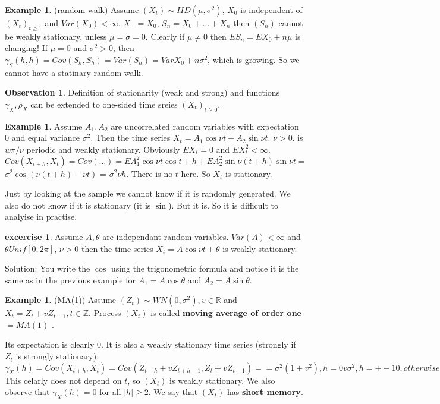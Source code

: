 \documentclass[12pt,a4paper]{amsart}
\theoremstyle{definition} %
\newtheorem{example}[defn]{Example}
\newtheorem{excercise}[defn]{excercise}
\newtheorem{observation}[defn]{Observation}
\theoremstyle{plain} %
\newcommand{\R}{\mathbb R}
\newcommand{\Z}{\mathbb Z}
\begin{document}
\begin{example} (random walk)
Assume $(X_t) \sim IID(\mu, \sigma^2)$, $X_0$ is independent of $(X_t)_{t \geq 1}$ and $Var(X_0) < \infty$.
$X_= = X_0$, $S_n = X_0 + \dots + X_n$ then $(S_n)$ cannot be weakly stationary, unless $\mu = \sigma = 0$.
Clearly if $\mu \neq 0$ then $ES_n = EX_0 + n\mu$ is changing!
If $\mu = 0$ and $\sigma^2 > 0$, then $\gamma_S(h,h) = Cov(S_h, S_h) = Var(S_h) = VarX_0 + n\sigma^2$, which is growing. So we cannot have a statinary random walk.
\end{example}

\begin{observation}
Definition of stationarity (weak and strong) and functions $\gamma_X, \rho_X$ can be extended to one-sided time sreies $(X_t)_ {t\geq 0}$. 
\end{observation}


\begin{example}
Assume $A_1, A_2$ are uncorrelated random variables with expectation $0$ and equal variance $\sigma^2$. Then the time series $X_t = A_1 \cos{\nu t} +A_2 \sin{\nu t}$. $\nu > 0$.
is $w\pi / \nu$ periodic and weakly stationary.
Obviously $EX_t = 0$ and $EX_t^2 < \infty$.
$Cov(X_{t+h}, X_t) = Cov(\dots) = E A_1^2 \cos{\nu t}\cos{t + h} + EA_2^2 \sin{\nu(t + h)}\sin{\nu t} = $
$\sigma^2 \cos(\nu (t + h) - \nu t)$ = $\sigma^2 \nu h$.
There is no $t$ here. So $X_t$ is stationary. 

Just by looking at the sample we cannot know if it is randomly generated. We also do not know if it is stationary (it is $\sin$).
But it is. So it is difficult to analyise in practise.
\end{example}


\begin{excercise}
Assume $A, \theta$ are independant random variables. $Var(A) < \infty$ and $\theta Unif[0,2\pi]$, $\nu > 0$ then the time series
$X_t = A \cos{\nu t + \theta}$ is weakly stationary. 

Solution:
You write the $\cos$ using the trigonometric formula and notice it is the same as in the previous example for 
$A_1 = A\cos{\theta}$ and $A_2 = A\sin{\theta}$.
\end{excercise}

\begin{example} (MA(1))
Assume $(Z_t) \sim WN(0, \sigma^2), v \in \R$
and $X_t = Z_t + vZ_{t-1}, t \in \Z$.
Process $(X_t)$ is called {\bf moving average of order one} $= MA(1)$ .

Its expectation is clearly $0$. It is also a weakly stationary time series (strongly if $Z_t$ is strongly stationary):
$\gamma_X(h) = Cov(X_{t + h}, X_t) = Cov(Z_{t+h} + vZ_{t+h-1}, Z_t + vZ_{t-1}) = 
=  \sigma^2(1 + v^2)   , h = 0
	v \sigma^2	 , h = +-1
		0	, otherwise
$
This celarly does not depend on $t$, so $(X_t)$ is weakly stationary. We also observe that $\gamma_X(h) = 0$ for all $|h| \geq 2$. We say that $(X_t)$ has {\bf short memory}.

\end{example}
\end{document}
